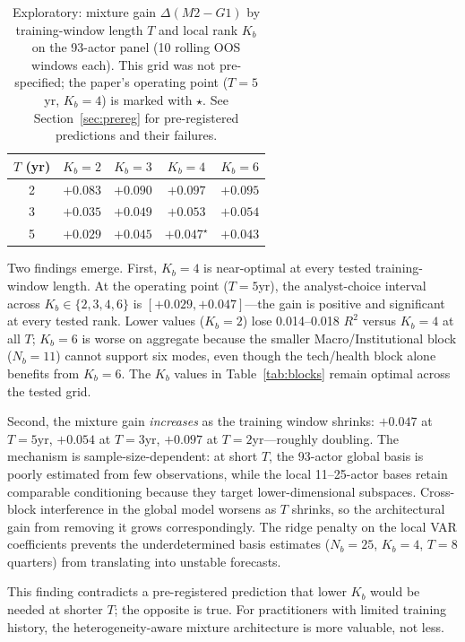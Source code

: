 \documentclass[11pt,a4paper]{article}
\begin{document}
\begin{table}[ht]
\centering
\caption{Exploratory: mixture gain $\Delta(M2 - G1)$ by training-window length $T$ and local rank $K_b$ on the 93-actor panel (10 rolling OOS windows each). This grid was not pre-specified; the paper's operating point ($T{=}5$yr, $K_b{=}4$) is marked with $\star$. See Section~\ref{sec:prereg} for pre-registered predictions and their failures.}
\label{tab:parsimony}
\small
\begin{tabular}{ccccc}
\toprule
$T$ (yr) & $K_b{=}2$ & $K_b{=}3$ & $K_b{=}4$ & $K_b{=}6$ \\
\midrule
2 & $+0.083$ & $+0.090$ & $\mathbf{+0.097}$ & $+0.095$ \\
3 & $+0.035$ & $+0.049$ & $+0.053$ & $\mathbf{+0.054}$ \\
5 & $+0.029$ & $+0.045$ & $+0.047^\star$ & $+0.043$ \\
\bottomrule
\end{tabular}
\end{table}

Two findings emerge. First, $K_b{=}4$ is near-optimal at every tested training-window length. At the operating point ($T{=}5$yr), the analyst-choice interval across $K_b \in \{2, 3, 4, 6\}$ is $[+0.029, +0.047]$---the gain is positive and significant at every tested rank. Lower values ($K_b{=}2$) lose 0.014--0.018 $R^2$ versus $K_b{=}4$ at all $T$; $K_b{=}6$ is worse on aggregate because the smaller Macro/Institutional block ($N_b{=}11$) cannot support six modes, even though the tech/health block alone benefits from $K_b{=}6$. The $K_b$ values in Table~\ref{tab:blocks} remain optimal across the tested grid.

Second, the mixture gain \emph{increases} as the training window shrinks: $+0.047$ at $T{=}5$yr, $+0.054$ at $T{=}3$yr, $+0.097$ at $T{=}2$yr---roughly doubling. The mechanism is sample-size-dependent: at short $T$, the 93-actor global basis is poorly estimated from few observations, while the local 11--25-actor bases retain comparable conditioning because they target lower-dimensional subspaces. Cross-block interference in the global model worsens as $T$ shrinks, so the architectural gain from removing it grows correspondingly. The ridge penalty on the local VAR coefficients prevents the underdetermined basis estimates ($N_b{=}25$, $K_b{=}4$, $T{=}8$ quarters) from translating into unstable forecasts.

This finding contradicts a pre-registered prediction that lower $K_b$ would be needed at shorter $T$; the opposite is true. For practitioners with limited training history, the heterogeneity-aware mixture architecture is more valuable, not less.
\end{document}
